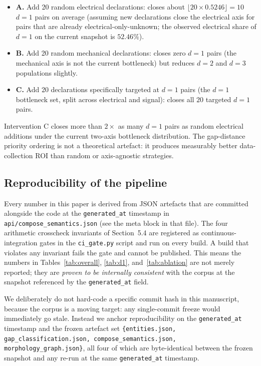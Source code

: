\documentclass[11pt,twocolumn]{article}
\begin{document}
\begin{itemize}[nosep,leftmargin=*]
\item \textbf{A.} Add 20 random electrical declarations: closes
about $\lfloor 20 \times 0.5246 \rfloor = 10$ $d=1$ pairs on average
(assuming new declarations close the electrical axis for pairs that
are already electrical-only-unknown; the observed electrical share
of $d=1$ on the current snapshot is $52.46\%$).

\item \textbf{B.} Add 20 random mechanical declarations: closes
zero $d=1$ pairs (the mechanical axis is not the current bottleneck)
but reduces $d=2$ and $d=3$ populations slightly.

\item \textbf{C.} Add 20 declarations specifically targeted at
$d=1$ pairs (the $d=1$ bottleneck set, split across electrical and
signal): closes all $20$ targeted $d=1$ pairs.
\end{itemize}

Intervention C closes more than $2\times$ as many $d=1$ pairs as
random electrical additions under the current two-axis bottleneck
distribution. The gap-distance priority ordering is not a
theoretical artefact: it produces measurably better data-collection
ROI than random or axis-agnostic strategies.

\subsection{Reproducibility of the pipeline}

Every number in this paper is derived from JSON artefacts that are
committed alongside the code at the \texttt{generated\_at} timestamp
in \texttt{api/compose\_semantics.json} (see the meta block in that
file). The four arithmetic crosscheck invariants of Section~5.4 are
registered as continuous-integration gates in the
\texttt{ci\_gate.py} script and run on every build. A build that
violates any invariant fails the gate and cannot be published.
This means the numbers in Tables~\ref{tab:overall},
\ref{tab:d1}, and~\ref{tab:ablation} are not merely reported;
they are \emph{proven to be internally consistent} with the corpus
at the snapshot referenced by the \texttt{generated\_at} field.

We deliberately do not hard-code a specific commit hash in this
manuscript, because the corpus is a moving target: any single-commit
freeze would immediately go stale. Instead we anchor reproducibility
on the \texttt{generated\_at} timestamp and the frozen artefact
set \texttt{\{entities.json, gap\_classification.json,
compose\_semantics.json, morphology\_graph.json\}}, all four of
which are byte-identical between the frozen snapshot and any
re-run at the same \texttt{generated\_at} timestamp.
\end{document}
